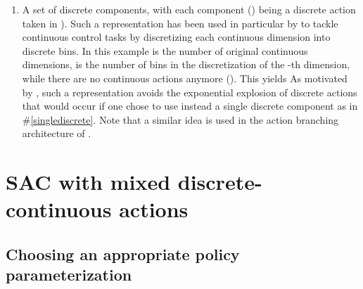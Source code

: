 \documentclass[letterpaper]{article} \usepackage{aaai20}  \usepackage{times}  \usepackage{helvet} \usepackage{courier}  \usepackage[hyphens]{url}  \usepackage{graphicx} \urlstyle{rm} \def\UrlFont{\rm}  \usepackage{graphicx}  \usepackage[section]{placeins}
\newcommand{\citet}{\cite}  \newcommand{\citep}{\cite} \DeclareMathOperator*{\softmax}{softmax}
\begin{document}
\begin{enumerate}
    \item A set of  discrete components, with each component  () being a discrete action taken in ). Such a representation has been used in particular by \citet{tang2019} to tackle continuous control tasks by discretizing each continuous dimension  into  discrete bins.
    In this example  is the number of original continuous dimensions,  is the number of bins in the discretization of the -th dimension, while there are no continuous actions anymore ().
    This yields 
    As motivated by \citet{tang2019}, such a representation avoids the exponential explosion of discrete actions that would occur if one chose to use instead a single discrete component as in \#\ref{singlediscrete}.
    Note that a similar idea is used in the action branching architecture of \citet{tavakoli2018}.

\end{enumerate}

\section{SAC with mixed discrete-continuous actions}

\subsection{Choosing an appropriate policy parameterization}
\end{document}
